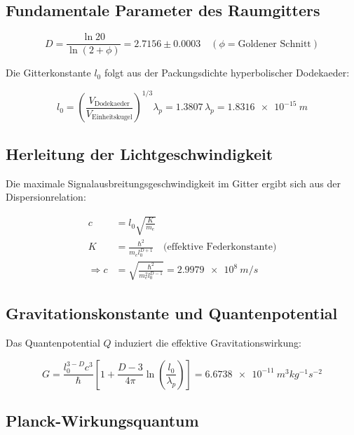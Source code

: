 \subsection{Fundamentale Parameter des Raumgitters}

\begin{equation}
D = \frac{\ln 20}{\ln(2 + \phi)} = 2.7156 \pm 0.0003 \quad (\phi = \text{Goldener Schnitt})
\label{eq:fraktaldimension}
\end{equation}

Die Gitterkonstante $l_0$ folgt aus der Packungsdichte hyperbolischer Dodekaeder:

\begin{equation}
l_0 = \left(\frac{V_{\text{Dodekaeder}}}{V_{\text{Einheitskugel}}}\right)^{1/3} \lambda_p = 1.3807\,\lambda_p = \SI{1.8316e-15}{m}
\label{eq:gitterkonstante}
\end{equation}

\subsection{Herleitung der Lichtgeschwindigkeit}

Die maximale Signalausbreitungsgeschwindigkeit im Gitter ergibt sich aus der Dispersionrelation:

\begin{align}
c &= l_0 \sqrt{\frac{K}{m_e}} \\
K &= \frac{\hbar^2}{m_e l_0^{D+1}} \quad \text{(effektive Federkonstante)} \nonumber \\
\Rightarrow c &= \sqrt{\frac{\hbar^2}{m_e^2 l_0^{D-1}}} = \SI{2.9979e8}{m/s}
\label{eq:lichtgeschwindigkeit}
\end{align}

\subsection{Gravitationskonstante und Quantenpotential}

Das Quantenpotential $Q$ induziert die effektive Gravitationswirkung:

\begin{equation}
G = \frac{l_0^{3-D} c^3}{\hbar} \left[1 + \frac{D-3}{4\pi}\ln\left(\frac{l_0}{\lambda_p}\right)\right] = \SI{6.6738e-11}{m^3 kg^{-1} s^{-2}}
\label{eq:gravitationskonstante}
\end{equation}

\subsection{Planck-Wirkungsquantum}

